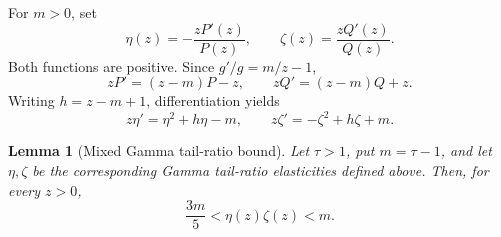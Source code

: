 \documentclass[11pt]{article}
\newtheorem{lemma}[theorem]{Lemma}
\theoremstyle{definition}
\theoremstyle{remark}
\newcommand{\1}{\mathbf 1}
\begin{document}
For \(m>0\), set
\[
  \eta(z)=-\frac{zP'(z)}{P(z)},
  \qquad
  \zeta(z)=\frac{zQ'(z)}{Q(z)}.
\]
Both functions are positive.  Since \(g'/g=m/z-1\),
\[
  zP'=(z-m)P-z,
  \qquad
  zQ'=(z-m)Q+z.
\]
Writing \(h=z-m+1\), differentiation yields
\begin{equation}
\label{eq:mds-gamma-riccati}
  z\eta'=\eta^2+h\eta-m,
  \qquad
  z\zeta'=-\zeta^2+h\zeta+m.
\end{equation}

\begin{lemma}[Mixed Gamma tail-ratio bound]
\label{lem:gamma-tail-ratio-bound}
Let \(\tau>1\), put \(m=\tau-1\), and let \(\eta,\zeta\) be the
corresponding Gamma tail-ratio elasticities defined above. Then, for
every \(z>0\),
\[
  \frac{3m}{5}<\eta(z)\zeta(z)<m.
\]
\end{lemma}
\end{document}
